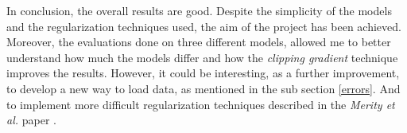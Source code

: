 In conclusion, the overall results are good. Despite the simplicity of the models and the regularization techniques used, the aim of the project has been achieved. Moreover, the evaluations done on three different models, allowed me to better understand how much the models differ and how the \emph{clipping gradient} technique improves the results. However, it could be interesting, as a further improvement, to develop a new way to load data, as mentioned in the sub section \ref{errors}. And to implement more difficult regularization techniques described in the \emph{Merity et al.} paper \cite{merity2017regularizing}.